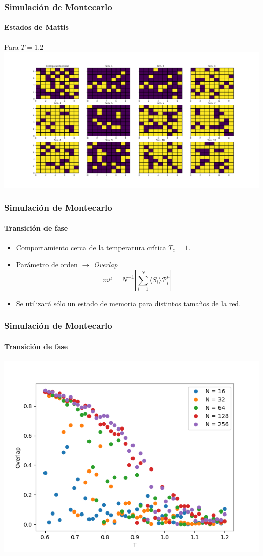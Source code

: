 \documentclass[11pt]{beamer}
\begin{document}
\begin{frame}
\frametitle{Simulación de Montecarlo}
\framesubtitle{Estados de Mattis}
Para $T = 1.2$
\includegraphics[width=\linewidth]{9x9_T=1,2.png}

\end{frame}

\begin{frame}
\frametitle{Simulación de Montecarlo}
\framesubtitle{Transición de fase}
\begin{itemize}
\item Comportamiento cerca de la temperatura crítica $T_{c} = 1$.
\item Parámetro de orden $\longrightarrow$ \textit{Overlap}
$$
m^{\mu} = N^{-1} \left| \sum_{i=1}^{N} \langle S_{i} \rangle \mathcal{P}^{\mu}_{i}  \right|
$$
\item Se utilizará sólo un estado de memoria para distintos tamaños de la red.
\end{itemize}
\end{frame}

\begin{frame}
\frametitle{Simulación de Montecarlo}
\framesubtitle{Transición de fase}
\includegraphics[width=\linewidth]{Overlap_FSS.png}
\end{frame}
\end{document}
